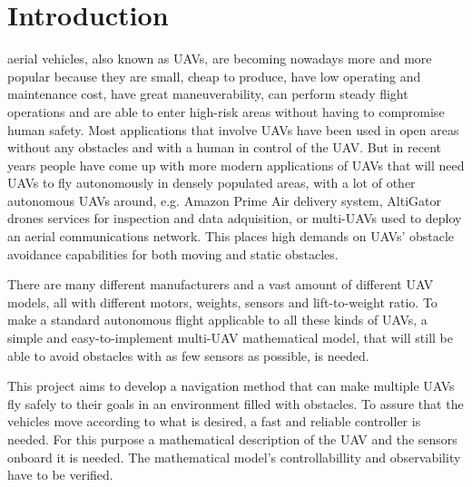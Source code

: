 \documentclass[journal]{IEEEtran}
\begin{document}
	\section{Introduction}
	 aerial vehicles, also known as UAVs, are becoming nowadays more and more popular because they are small, cheap to produce, have low operating and maintenance cost, have great maneuverability, can perform steady flight operations and are able to enter high-risk areas without having to compromise human safety. Most applications that involve UAVs have been used in open areas without any obstacles and with a human in control of the UAV. But in recent years people have come up with more modern applications of UAVs that will need UAVs to fly autonomously in densely populated areas, with a lot of other autonomous UAVs around, e.g. Amazon Prime Air delivery system, AltiGator drones services for inspection and data adquisition, or multi-UAVs used to deploy an aerial communications network. This places high demands on UAVs’ obstacle avoidance capabilities for both moving and static obstacles.
	
	There are many different manufacturers and a vast amount of different UAV models, all with different motors, weights, sensors and lift-to-weight ratio. To make a standard autonomous flight applicable to all these kinds of UAVs, a simple and easy-to-implement multi-UAV mathematical model, that will still be able to avoid obstacles with as few sensors as possible, is needed.
	
	This project aims to develop a navigation method that can make multiple UAVs fly safely to their goals in an environment filled with obstacles. To assure that the vehicles move according to what is desired, a fast and reliable controller is needed. For this purpose a mathematical description of the UAV and the sensors onboard it is needed. The mathematical model's controllabillity and observability have to be verified. 
	
\end{document}
